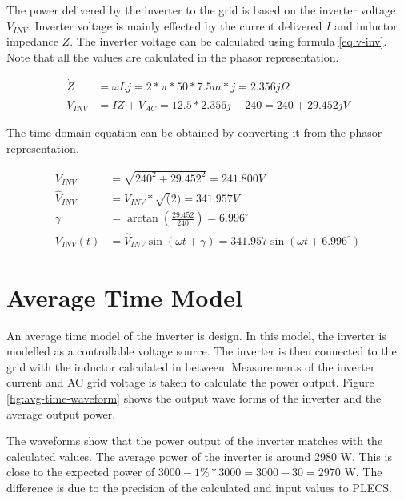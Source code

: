 \documentclass[12pt]{article}
\begin{document}
The power delivered by the inverter to the grid is based on the inverter voltage $V_{INV}$.
Inverter voltage is mainly effected by the current delivered $I$ and inductor impedance $Z$.
The inverter voltage can be calculated using formula \ref{eq:v-inv}.
Note that all the values are calculated in the phasor representation.

\begin{equation} \label{eq:v-inv}
    \begin{aligned}
        \dot{Z}       & = \omega{L}j = 2 * \pi * 50 * 7.5m * j = 2.356j \Omega                   \\
        \dot{V}_{INV} & = \dot{I} \dot{Z} + \dot{V}_{AC} = 12.5 * 2.356j + 240 = 240 + 29.452j V
    \end{aligned}
\end{equation}

The time domain equation can be obtained by converting it from the phasor representation.

\begin{equation}
    \begin{aligned}
        V_{INV}       & = \sqrt{240^2 + 29.452^2} = 241.800 V                                                  \\
        \hat{V}_{INV} & = V_{INV} * \sqrt(2) = 341.957 V                                                       \\
        \gamma        & = \arctan(\frac{29.452}{240}) = 6.996^{\circ{}}                                        \\
        V_{INV}(t)    & = \hat{V}_{INV} \sin(\omega{t} + \gamma{}) = 341.957 \sin(\omega{t} + 6.996^{\circ{}})
    \end{aligned}
\end{equation}

\section{Average Time Model}
\label{sec:avg-time-model}

An average time model of the inverter is design.
In this model, the inverter is modelled as a controllable voltage source.
The inverter is then connected to the grid with the inductor calculated in between.
Measurements of the inverter current and AC grid voltage is taken to calculate the power output.
Figure \ref{fig:avg-time-waveform} shows the output wave forms of the inverter and the average output power.

The waveforms show that the power output of the inverter matches with the calculated values.
The average power of the inverter is around 2980 W.
This is close to the expected power of $3000 - 1\% * 3000 = 3000 - 30 = 2970$ W.
The difference is due to the precision of the calculated and input values to PLECS.
\end{document}
